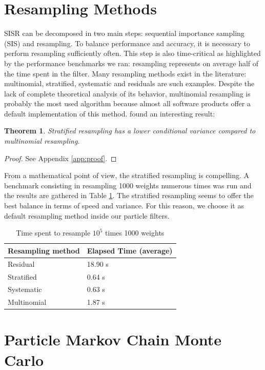 \documentclass[11pt,a4,twosided,singlespacing,titlepagenumber=on]{scrreprt}
\numberwithin{equation}{chapter} %
\newtheorem{theorem}{Theorem}%
\theoremstyle{remark}
\begin{document}
\section{Resampling Methods}
SISR can be decomposed in two main steps: sequential importance sampling (SIS) and resampling. To balance performance and accuracy, it is necessary to perform resampling sufficiently often. This step is also time-critical as highlighted by the performance benchmarks we ran: resampling represents on average half of the time spent in the filter. Many resampling methods exist in the literature: multinomial, stratified, systematic and residuals are such examples. Despite the lack of complete theoretical analysis of its behavior, multinomial resampling is probably the most used algorithm because almost all software products offer a default implementation of this method. \cite{douc2005} found an interesting result:
\begin{theorem}
\textit{
Stratified resampling has a lower conditional variance compared to multinomial resampling.
}
\end{theorem}
\begin{proof}
See Appendix \ref{app:proof}.
\end{proof}

From a mathematical point of view, the stratified resampling is compelling. A benchmark consisting in resampling 1000 weights numerous times was run and the results are gathered in Table \ref{resampling_method_table}. The stratified resampling seems to offer the best balance in terms of speed and variance. For this reason, we choose it as default resampling method inside our particle filters.

\begin{table}[H]
\centering
\begin{tabular}{ll}
\hline
\multicolumn{1}{|l|}{Resampling method}     & \multicolumn{1}{l|}{Elapsed Time (average)} \\ \hline
Residual 					   &  18.90 s \\
Stratified   				 &  0.64 s \\
Systematic   				 &  0.63 s \\
Multinomial          &  1.87 s \\
\hline
\end{tabular}
\caption{Time spent to resample $10^5$ times 1000 weights}
\label{resampling_method_table}
\end{table}

\section{Particle Markov Chain Monte Carlo}
\end{document}
